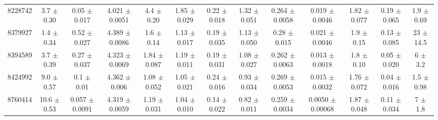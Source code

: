 \begin{table}[H]
\begin{tabular}{c|cccccc|cccccc}
8228742  &        3.7    $\pm$  0.30   &      0.05   $\pm$  0.017  &      4.021  $\pm$  0.0051 &      4.4    $\pm$  0.20   &      1.85   $\pm$  0.029  &      0.22   $\pm$  0.018    &        1.32   $\pm$  0.051    &        0.264  $\pm$  0.0058   &        0.019  $\pm$  0.0046   &        1.82   $\pm$  0.077    &        0.19   $\pm$  0.065    &        1.9    $\pm$  0.69     \\
8379927  &        1.4    $\pm$  0.34   &      0.52   $\pm$  0.027  &      4.389  $\pm$  0.0086 &      1.6    $\pm$  0.14   &      1.13   $\pm$  0.017  &      0.19   $\pm$  0.035    &        1.13   $\pm$  0.050    &        0.28   $\pm$  0.015    &        0.021  $\pm$  0.0046   &        1.9    $\pm$  0.15     &        0.13   $\pm$  0.085    &       23      $\pm$ 14.5      \\
8394589  &        3.7    $\pm$  0.39   &      0.27   $\pm$  0.037  &      4.323  $\pm$  0.0069 &      1.84   $\pm$  0.087  &      1.19   $\pm$  0.011  &      0.19   $\pm$  0.031    &        1.08   $\pm$  0.027    &        0.262  $\pm$  0.0063   &        0.013  $\pm$  0.0018   &        1.8    $\pm$  0.10     &        0.05   $\pm$  0.020    &        6      $\pm$  3.2      \\
8424992  &        9.0    $\pm$  0.57   &      0.1    $\pm$  0.01   &      4.362  $\pm$  0.006  &      1.08   $\pm$  0.052  &      1.05   $\pm$  0.021  &      0.24   $\pm$  0.016    &        0.93   $\pm$  0.034    &        0.269  $\pm$  0.0053   &        0.015  $\pm$  0.0032   &        1.76   $\pm$  0.072    &        0.04   $\pm$  0.016    &        1.5    $\pm$  0.98     \\
8760414  &       10.6    $\pm$  0.53   &      0.057  $\pm$  0.0091 &      4.319  $\pm$  0.0059 &      1.19   $\pm$  0.031  &      1.04   $\pm$  0.010  &      0.14   $\pm$  0.022    &        0.82   $\pm$  0.011    &        0.259  $\pm$  0.0034   &        0.0050 $\pm$  0.00068  &        1.87   $\pm$  0.048    &        0.11   $\pm$  0.034    &        7      $\pm$  1.8      \\

\end{tabular}
\end{table}
